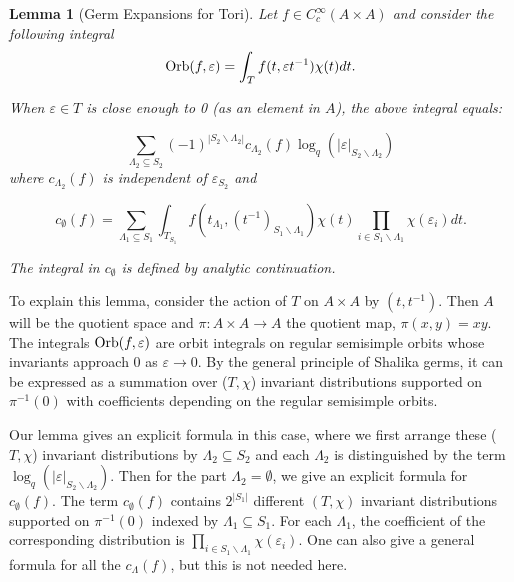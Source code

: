 \documentclass[11pt, oneside,reqno]{amsart}   	%
\newtheorem{lemma}[theorem]{Lemma}
\begin{document}
\begin{lemma}[Germ Expansions for Tori] \label{main}
Let $f \in C_c^\infty(A\times A)$ and  consider the following integral $$\textup{Orb}(f,\varepsilon)=\int_T f(t, \varepsilon t^{-1})\chi(t)dt.$$ 

When $\varepsilon \in T$ is close enough to 0 (as an element in $A$), the above integral equals:

$$\sum_{\Lambda_2 \subseteq S_2}(-1)^{|S_2 \backslash \Lambda_2|} c_{\Lambda_2}(f) \log_q(|\varepsilon|_{S_2 \backslash \Lambda_2})$$
where $c_{\Lambda_2}(f)$ is independent of $\varepsilon_{S_2}$ and 

$$c_\emptyset(f)=\sum_{\Lambda_1 \subseteq S_1} \int_{T_{S_1}} f(t_{\Lambda_1},(t^{-1})_{S_1 \backslash \Lambda_1}) \chi(t) \prod_{i \in S_1\backslash \Lambda_1} \chi(\varepsilon_i) dt .$$

The integral in $c_\emptyset$ is defined by analytic continuation.




\end{lemma}


To explain this lemma, consider the action of $T$ on $A \times A$ by $(t, t^{-1})$. Then $A$ will be the quotient space and $\pi: A \times A \rightarrow A$ the quotient map, $\pi(x,y)=xy$.
The integrals $\textup{Orb}(f,\varepsilon)$ are orbit integrals on regular semisimple orbits whose invariants approach 0 as $\varepsilon \rightarrow 0$. By the general principle of Shalika germs, it can be expressed as a summation over ($T,\chi$) invariant distributions supported on $\pi^{-1}(0)$ with coefficients depending on the regular semisimple orbits. 

Our lemma gives an explicit formula in this case, where we first arrange these ($T,\chi$) invariant distributions by $\Lambda_2 \subseteq S_2$ and each $\Lambda_2$ is distinguished by the term $\log_q(|\varepsilon|_{S_2 \backslash \Lambda_2})$. Then for the part $\Lambda_2=\emptyset$, we give an explicit formula for $c_\emptyset(f)$. The term $c_\emptyset(f)$ contains $2^{|S_1|}$ different $(T,\chi)$ invariant distributions supported on $\pi^{-1}(0)$ indexed by $\Lambda_1 \subseteq S_1$. For each $\Lambda_1$, the coefficient of the corresponding distribution is  $\prod_{i \in S_1 \backslash \Lambda_1} \chi(\varepsilon_i)$. One can also give a general formula for all the $c_\Lambda(f)$, but this is not needed here.
\end{document}
